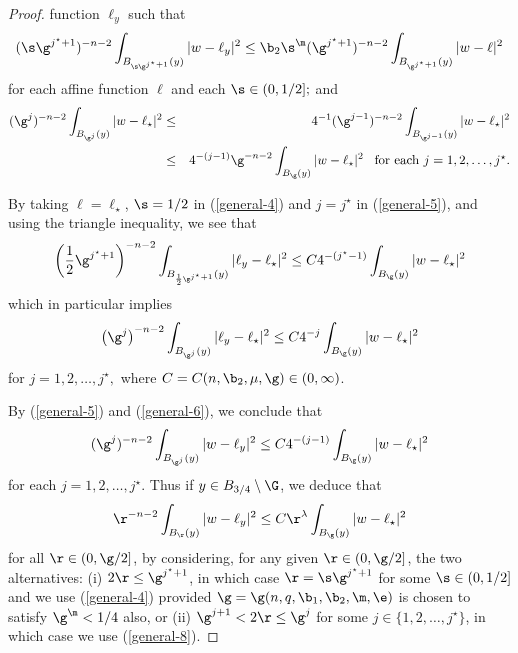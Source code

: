 \documentclass[a4paper,11pt]{amsart}
\begin{document}
\begin{proof}
function $\ell_{y}$ such that 
\begin{equation}\label{general-4}
(\s\g^{j^{\star}+1})^{-n-2}\int_{B_{\s\g^{j^{\star} +1}}(y)}|w - \ell_{y}|^{2} \leq \b_{2}\s^{\m}(\g^{j^{\star}+1})^{-n-2}\int_{B_{\g^{j^{\star}+1}}(y)}|w - \ell|^{2}
\end{equation}
for each affine function $\ell$ and each $\s \in (0, 1/2];$ and 
\begin{eqnarray}\label{general-5}
(\g^{j})^{-n-2}\int_{B_{\g^{j}}(y)}|w - \ell_{\star}|^{2} &\leq& 4^{-1}(\g^{j-1})^{-n-2} \int_{B_{\g^{j-1}}(y)}|w - \ell_{\star}|^{2} \nonumber\\
&\leq& 4^{-(j-1)} \g^{-n-2}\int_{B_{\g}(y)}|w - \ell_{\star}|^{2} \;\;\; \mbox{for each $j= 1, 2, \ldots, j^{\star}.$} 
\end{eqnarray}
 


By taking $\ell = \ell_{\star}$, $\s =1/2$ in (\ref{general-4}) and $j = j^{\star}$ in (\ref{general-5}), and using the triangle inequality,  we see  that
 $$\left(\frac{1}{2}\g^{j^{\star} + 1}\right)^{-n-2}\int_{B_{\frac{1}{2}\g^{j^{\star}+1}}(y)} |\ell_{y} - \ell_{\star}|^{2} \leq C 4^{-(j^{\star} - 1)}\int_{B_{\g}(y)} |w - \ell_{\star}|^{2}$$
which in particular implies 
\begin{equation}\label{general-6}
\left(\g^{j}\right)^{-n-2}\int_{B_{\g^{j}}(y)}|\ell_{y} - \ell_{\star}|^{2} \leq C4^{-j} \int_{B_{\g}(y)}|w - \ell_{\star}|^{2}
\end{equation}
for $j=1, 2, \ldots, j^{\star},$ where $C = C(n, \b_{2}, \mu, \g) \in (0, \infty)$.



By (\ref{general-5}) and (\ref{general-6}), we conclude that
\begin{equation}\label{general-8}
(\g^{j})^{-n-2}\int_{B_{\g^{j}}(y)} |w- \ell_{y}|^{2} \leq C4^{-(j-1)}\int_{B_{\g}(y)} |w - \ell_{\star}|^{2}
\end{equation}
for each $j=1, 2, \ldots, j^{\star}.$ Thus if $y \in B_{3/4} \setminus \G$, we deduce that
\begin{equation}\label{general-9}
\r^{-n-2}\int_{B_{\r}(y)}|w - \ell_{y}|^{2} \leq C\r^{\lambda} 
\int_{B_{\g}(y)}|w-\ell_{\star}|^{2}
\end{equation}
for all $\r \in (0, \g/2]$, by considering, for any given $\r \in (0, \g/2]$, the two alternatives: (i) $2\r \leq \g^{j^{\star} +1}$, in which case 
$\r = \s\g^{j^{\star} +1}$ for some $\s \in (0, 1/2]$ and we use (\ref{general-4}) provided  
$\g = \g(n, q, \b_{1}, \b_{2}, \m, \e)$ is chosen to satisfy $\g^{\m} < 1/4$ also, or (ii) $\g^{j+1} < 2\r \leq \g^{j}$ for some $j \in \{1, 2, \ldots, j^{\star}\}$, in which case we use (\ref{general-8}). 


\end{proof}
\end{document}
